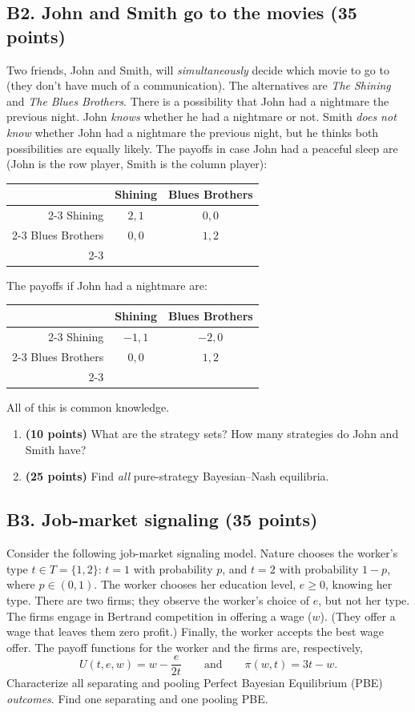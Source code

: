 \documentclass[11pt]{article}
\newcommand{\pts}[1]{\textbf{(#1 points)}}
\begin{document}
\subsection*{B2. John and Smith go to the movies \pts{35}}
Two friends, John and Smith, will \emph{simultaneously} decide which movie to go to (they don't have much of a communication). The alternatives are \emph{The Shining} and \emph{The Blues Brothers}. There is a possibility that John had a nightmare the previous night. John \emph{knows} whether he had a nightmare or not. Smith \emph{does not know} whether John had a nightmare the previous night, but he thinks both possibilities are equally likely. The payoffs in case John had a peaceful sleep are (John is the row player, Smith is the column player):
\begin{center}
\begin{tabular}{r|c|c|}
  \multicolumn{1}{c}{} & \multicolumn{1}{c}{Shining} & \multicolumn{1}{c}{Blues Brothers} \\ \cline{2-3}
  Shining        & $2,1$ & $0,0$ \\ \cline{2-3}
  Blues Brothers & $0,0$ & $1,2$ \\ \cline{2-3}
\end{tabular}
\end{center}
The payoffs if John had a nightmare are:
\begin{center}
\begin{tabular}{r|c|c|}
  \multicolumn{1}{c}{} & \multicolumn{1}{c}{Shining} & \multicolumn{1}{c}{Blues Brothers} \\ \cline{2-3}
  Shining        & $-1,1$ & $-2,0$ \\ \cline{2-3}
  Blues Brothers & $0,0$  & $1,2$  \\ \cline{2-3}
\end{tabular}
\end{center}
All of this is common knowledge.
\begin{enumerate}
  \item[(a)] \pts{10} What are the strategy sets? How many strategies do John and Smith have?
  \item[(b)] \pts{25} Find \emph{all} pure-strategy Bayesian--Nash equilibria.
\end{enumerate}

\subsection*{B3. Job-market signaling \pts{35}}
Consider the following job-market signaling model. Nature chooses the worker's type $t\in T=\{1,2\}$: $t=1$ with probability $p$, and $t=2$ with probability $1-p$, where $p\in(0,1)$. The worker chooses her education level, $e\ge 0$, knowing her type. There are two firms; they observe the worker's choice of $e$, but not her type. The firms engage in Bertrand competition in offering a wage ($w$). (They offer a wage that leaves them zero profit.) Finally, the worker accepts the best wage offer. The payoff functions for the worker and the firms are, respectively,
\[
  U(t,e,w)=w-\frac{e}{2t} \qquad\text{and}\qquad \pi(w,t)=3t-w .
\]
Characterize all separating and pooling Perfect Bayesian Equilibrium (PBE) \emph{outcomes}. Find one separating and one pooling PBE.
\end{document}
